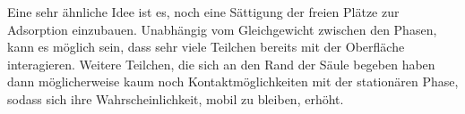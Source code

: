 Eine sehr ähnliche Idee ist es, noch eine Sättigung der freien Plätze zur Adsorption einzubauen. Unabhängig vom Gleichgewicht zwischen den Phasen, kann es möglich sein, dass sehr viele Teilchen bereits mit der Oberfläche interagieren. Weitere Teilchen, die sich an den Rand der Säule begeben haben dann möglicherweise kaum noch Kontaktmöglichkeiten mit der stationären Phase, sodass sich ihre Wahrscheinlichkeit, mobil zu bleiben, erhöht.


